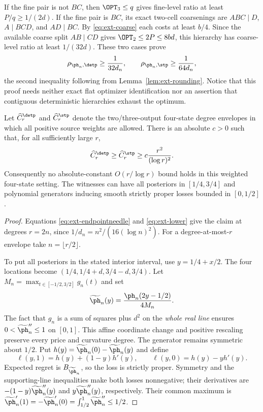 If the fine pair is not $BC$, then $\OPT_3\le q$ gives fine-level ratio
at least $P/q\ge1/(2d)$. If the fine pair is $BC$, its exact two-cell
coarsenings are $ABC\mid D$, $A\mid BCD$, and $AD\mid BC$. By
\eqref{eq:ext-coarse} each costs at least $b/4$. Since the available
coarse split $AB\mid CD$ gives $\OPT_2\le2P\le8bd$, this hierarchy has
coarse-level ratio at least $1/(32d)$. These two cases prove
\begin{equation}
 \rho_{\ph_n,\detp}\ge\frac1{32d_n},\qquad
 \rho_{\ph_n,\stp}\ge\frac1{64d_n},
 \label{eq:ext-lower}
\end{equation}
the second inequality following from Lemma~\ref{lem:ext-rounding}.
Notice that this proof needs neither exact flat optimizer identification nor
an assertion that contiguous deterministic hierarchies exhaust the optimum.

\begin{theorem}
\label{thm:ext-weightdegenerate}
Let $\widehat C_r^{\detp}$ and $\widehat C_r^{\stp}$ denote the two/three-output
four-state degree envelopes in which all positive source weights are allowed.
There is an absolute $c>0$ such that, for all sufficiently large $r$,
\[
 \widehat C_r^{\detp}\ge\widehat C_r^{\stp}
 \ge c\frac{r^2}{(\log r)^2}.
\]
Consequently no absolute-constant $O(r/\log r)$ bound holds in this weighted
four-state setting. The witnesses can have all posteriors in $[1/4,3/4]$
and polynomial generators inducing smooth strictly proper losses bounded
in $[0,1/2]$.
\end{theorem}
\begin{proof}
Equations \eqref{eq:ext-endpointneedle} and \eqref{eq:ext-lower} give the
claim at degrees $r=2n$, since $1/d_n=n^2/(16(\log n)^2)$.
For a degree-at-most-$r$ envelope take $n=\lfloor r/2\rfloor$.

To put all posteriors in the stated interior interval, use
$y=1/4+x/2$. The four locations become
$(1/4,1/4+d,3/4-d,3/4)$.
Let $M_n=\max_{t\in[-1/2,3/2]}g_n(t)$ and set
\[
 \widetilde\ph_n(y)=\frac{\ph_n(2y-1/2)}{4M_n}.
\]
The fact that $g_n$ is a sum of squares plus $d^2$ on the \emph{whole real
line} ensures $0<\widetilde\ph_n''\le1$ on $[0,1]$. This affine coordinate
change and positive rescaling preserve every price and curvature degree.
The generator remains symmetric about $1/2$. Put
$h(y)=\widetilde\ph_n(0)-\widetilde\ph_n(y)$ and define
\[
 \ell(y,1)=h(y)+(1-y)h'(y),\qquad
 \ell(y,0)=h(y)-yh'(y).
\]
Expected regret is $B_{\widetilde\ph_n}$, so the loss is strictly proper.
Symmetry and the supporting-line inequalities make both losses nonnegative;
their derivatives are $-(1-y)\widetilde\ph_n''(y)$ and
$y\widetilde\ph_n''(y)$, respectively. Their common maximum is
$\widetilde\ph_n'(1)=-\widetilde\ph_n'(0)
=\int_{1/2}^1\widetilde\ph_n''\le1/2$.
\end{proof}

